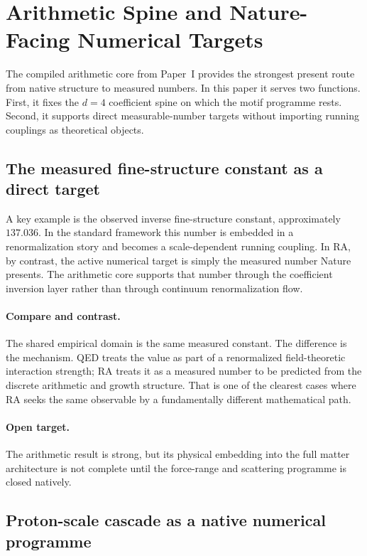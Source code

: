 \documentclass[11pt]{article}
\begin{document}
\section{Arithmetic Spine and Nature-Facing Numerical Targets}

The compiled arithmetic core from Paper~I provides the strongest present route from native structure to measured numbers. In this paper it serves two functions. First, it fixes the $d=4$ coefficient spine on which the motif programme rests. Second, it supports direct measurable-number targets without importing running couplings as theoretical objects.

\subsection{The measured fine-structure constant as a direct target}

A key example is the observed inverse fine-structure constant, approximately $137.036$. In the standard framework this number is embedded in a renormalization story and becomes a scale-dependent running coupling. In RA, by contrast, the active numerical target is simply the measured number Nature presents. The arithmetic core supports that number through the coefficient inversion layer rather than through continuum renormalization flow.

\paragraph{Compare and contrast.} The shared empirical domain is the same measured constant. The difference is the mechanism. QED treats the value as part of a renormalized field-theoretic interaction strength; RA treats it as a measured number to be predicted from the discrete arithmetic and growth structure. That is one of the clearest cases where RA seeks the same observable by a fundamentally different mathematical path.

\paragraph{Open target.} The arithmetic result is strong, but its physical embedding into the full matter architecture is not complete until the force-range and scattering programme is closed natively.

\subsection{Proton-scale cascade as a native numerical programme}
\end{document}
